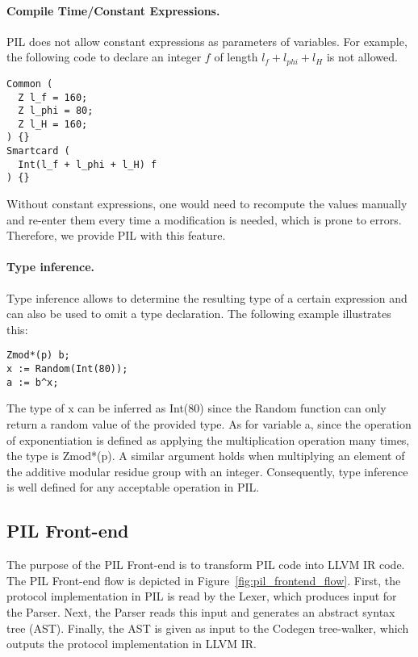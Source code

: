 \paragraph{Compile Time/Constant Expressions.} PIL does not allow
constant expressions as parameters of variables. For example, the following code to declare an integer $f$ of length $l_f + l_{phi} + l_H$ is not allowed.
\begin{lstlisting}[language=PIL]
Common (
  Z l_f = 160;
  Z l_phi = 80;
  Z l_H = 160;
) {}
Smartcard (
  Int(l_f + l_phi + l_H) f
) {}
\end{lstlisting}
Without constant expressions, one would need to recompute the values
manually and re-enter them every time a modification is needed, which is prone to errors. Therefore, we provide PIL with this feature.

\paragraph{Type inference.}
Type inference allows to determine the resulting
type of a certain expression and can also be used to omit
a type declaration. The following example illustrates this:
\begin{lstlisting}[language=PIL]
Zmod*(p) b;
x := Random(Int(80));
a := b^x;
\end{lstlisting}
The type of x can be inferred as Int(80) since
the Random function can only return a random value of the provided
type. As for variable a, since the operation of exponentiation is defined as
applying the multiplication operation many times, the type is Zmod*(p). A similar argument holds when multiplying an element
of the additive modular residue group with an integer. Consequently,
type inference is well defined for any acceptable operation in PIL.

\subsection{PIL Front-end}
\label{pilfrontend}

The purpose of the PIL Front-end is to transform PIL code into LLVM IR code. The PIL Front-end flow is depicted in Figure~\ref{fig:pil_frontend_flow}. First, the protocol implementation in PIL is read by the Lexer, which produces input for the Parser. Next, the Parser reads this input and generates an abstract syntax tree (AST). Finally, the AST is given as input to the Codegen tree-walker, which outputs the protocol implementation in LLVM IR.

